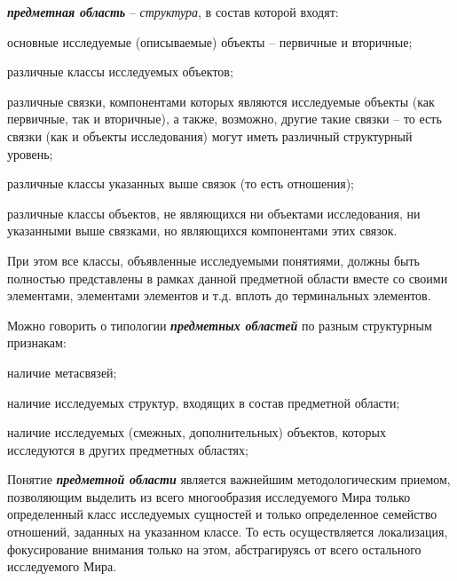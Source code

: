 \begin{SCn}
{\textbf{\textit{предметная область}} – \textit{структура}, в состав которой входят:
\begin{scnitemize}
\item \textnormal{основные исследуемые (описываемые) объекты – первичные и вторичные;}
\item \textnormal{различные классы исследуемых объектов;}
\item \textnormal{различные связки, компонентами которых являются исследуемые объекты (как первичные, так и вторичные), а также, возможно, другие такие связки – то есть связки (как и объекты исследования) могут иметь различный структурный уровень;}
\item \textnormal{различные классы указанных выше связок (то есть отношения);}
\item \textnormal{различные классы объектов, не являющихся ни объектами исследования, ни указанными выше связками, но являющихся компонентами этих связок.}
\end{scnitemize}


При этом все классы, объявленные исследуемыми понятиями, должны быть полностью представлены в рамках данной предметной области вместе со своими элементами, элементами элементов и т.д. вплоть до терминальных элементов.


Можно говорить о типологии \textbf{\textit{предметных областей}} по разным структурным признакам:
\begin{scnitemize}
    \item наличие метасвязей;
    \item наличие исследуемых структур, входящих в состав предметной области;
    \item наличие исследуемых (смежных, дополнительных) объектов, которых исследуются в других предметных областях;
\end{scnitemize}


Понятие \textbf{\textit{предметной области}} является важнейшим методологическим приемом, позволяющим выделить из всего многообразия исследуемого Мира только определенный класс исследуемых сущностей и только определенное семейство отношений, заданных на указанном классе. То есть осуществляется локализация, фокусирование внимания только на этом, абстрагируясь от всего остального исследуемого Мира.


}
\end{SCn}

